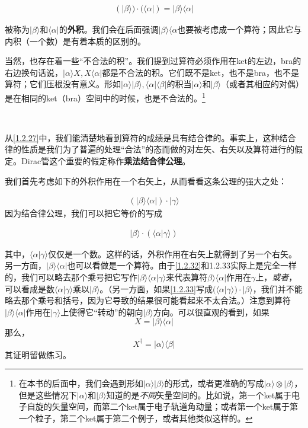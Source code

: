 \documentclass[UTF8,twoside]{ctexart}
\def\be{\begin{equation}}
\def\ee{\end{equation}}
\begin{document}
\begin{align}
(|\beta\rangle)\cdot(\langle\alpha|)=|\beta\rangle\langle\alpha|
\end{align}

\noindent 被称为$|\beta\rangle$和$\langle\alpha|$的{\bf 外积}。我们会在后面强调$|\beta\rangle\langle\alpha$也要被考虑成一个算符；因此它与内积（一个数）是有着本质的区别的。

当然，也存在着一些``不合法的积''。我们提到过算符必须作用在ket的左边，bra的右边换句话说，$|\alpha\rangle X, X\langle\alpha|$都是不合法的积。它们既不是ket，也不是bra，也不是算符；它们压根没有意义。形如$|\alpha\rangle|\beta\rangle,\langle\alpha|\langle\beta|$的积当$|\alpha\rangle$和$|\beta\rangle$（或者其相应的对偶）是在相同的ket（bra）空间中的时候，也是不合法的。\footnote{在本书的后面中，我们会遇到形如$|\alpha\rangle|\beta\rangle$的形式，或者更准确的写成$|\alpha\rangle\otimes|\beta\rangle$，但是这些情况下$|\alpha\rangle$和$|\beta\rangle$知道的是{\emph{不同}}矢量空间的。比如说，第一个ket属于电子自旋的矢量空间，而第二个ket属于电子轨道角动量；或者第一个ket属于第一个粒子，第二个ket属于第二个例子，或者其他类似这样的。}

\ 


\noindent 从\eqref{1.2.27}中，我们能清楚地看到算符的成绩是具有结合律的。事实上，这种结合律的性质是我们为了普遍的处理``合法''的态而做的对左矢、右矢以及算符进行的假定。Dirac管这个重要的假定称作{\bf 乘法结合律公理}。

我们首先考虑如下的外积作用在一个右矢上，从而看看这条公理的强大之处：

\begin{align}\label{1.2.32}
(|\beta\rangle\langle\alpha|)\cdot|\gamma\rangle
\end{align}
因为结合律公理，我们可以把它等价的写成

\begin{align}\label{1.2.33}
|\beta\rangle\cdot(\langle\alpha|\gamma\rangle)
\end{align}

\noindent 其中，$\langle\alpha|\gamma\rangle$仅仅是一个数。这样的话，外积作用在右矢上就得到了另一个右矢。另一方面，$|\beta\rangle\langle\alpha|$也可以看做是一个算符。由于\eqref{1.2.32}和{1.2.33}实际上是完全一样的，我们可以略去那个乘号把它写作$|\beta\rangle\langle\alpha|\gamma\rangle$来代表算符$\beta\rangle\langle\alpha|$作用在$\gamma$上，{\it 或者}，可以看成是数$\langle\alpha|\gamma\rangle$乘以$|\beta\rangle$。（另一方面，如果\eqref{1.2.33}写成$(\langle\alpha|\gamma\rangle)\cdot|\beta\rangle$，我们并不能略去那个乘号和括号，因为它导致的结果很可能看起来不太合法。）注意到算符$|\beta\rangle\langle\alpha|$作用在$|\gamma\rangle$上使得它``转动''的朝向$|\beta\rangle$方向。可以很直观的看到，如果
\be
X=|\beta\rangle\langle\alpha|
\ee
那么，
\be
X^\dagger = |\alpha\rangle\langle\beta|
\ee
其证明留做练习。
\end{document}

